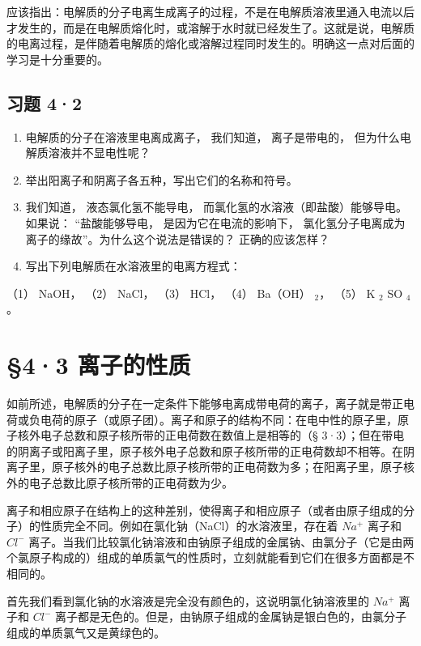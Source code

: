 应该指出：电解质的分子电离生成离子的过程，不是在电解质溶液里通入电流以后才发生的，而是在电解质熔化时，或溶解于水时就已经发生了。这就是说，电解质的电离过程，是伴随着电解质的熔化或溶解过程同时发生的。明确这一点对后面的学习是十分重要的。

\subsection{习题 4·2}

\begin{enumerate}
\item
  电解质的分子在溶液里电离成离子， 我们知道， 离子是带电的，
  但为什么电解质溶液并不显电性呢？
\item
  举出阳离子和阴离子各五种，写出它们的名称和符号。
\item
  我们知道， 液态氯化氢不能导电，
  而氯化氢的水溶液（即盐酸）能够导电。如果说： ``盐酸能够导电，
  是因为它在电流的影响下，
  氯化氢分子电离成为离子的缘故''。为什么这个说法是错误的？
  正确的应该怎样？
\item
  写出下列电解质在水溶液里的电离方程式：
\end{enumerate}

（1） NaOH， （2） NaCl， （3） HCl， （4） Ba（OH） \(_{2}\)， （5） K
\(_{2}\) SO \(_{4}\) 。

\section{§4·3 离子的性质}

如前所述，电解质的分子在一定条件下能够电离成带电荷的离子，离子就是带正电荷或负电荷的原子（或原子团）。离子和原子的结构不同：在电中性的原子里，原子核外电子总数和原子核所带的正电荷数在数值上是相等的（§
3·3）；但在带电的阴离子或阳离子里，原子核外电子总数和原子核所带的正电荷数却不相等。在阴离子里，原子核外的电子总数比原子核所带的正电荷数为多；在阳离子里，原子核外的电子总数比原子核所带的正电荷数为少。

离子和相应原子在结构上的这种差别，使得离子和相应原子（或者由原子组成的分子）的性质完全不同。例如在氯化钠（NaCl）的水溶液里，存在着
\(Na^{+}\) 离子和 \(Cl^{-}\)
离子。当我们比较氯化钠溶液和由钠原子组成的金属钠、由氯分子（它是由两个氯原子构成的）组成的单质氯气的性质时，立刻就能看到它们在很多方面都是不相同的。

首先我们看到氯化钠的水溶液是完全没有颜色的，这说明氯化钠溶液里的
\(Na^{+}\) 离子和 \(Cl^{-}\)
离子都是无色的。但是，由钠原子组成的金属钠是银白色的，由氯分子组成的单质氯气又是黄绿色的。

